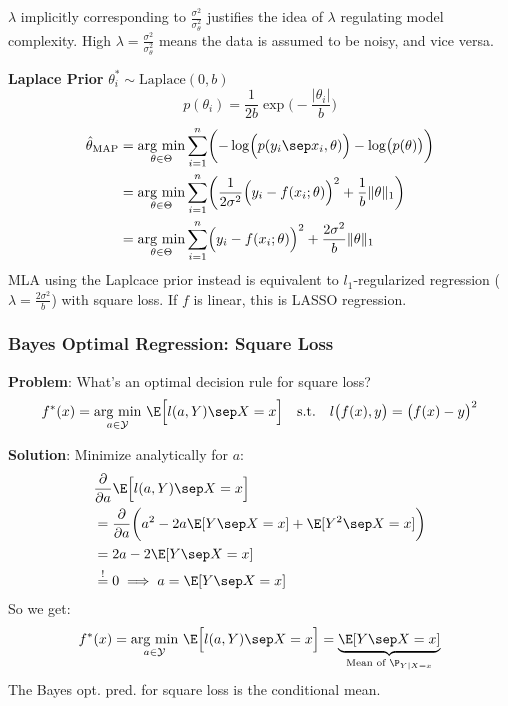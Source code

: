 {\footnotesize
    \remark $\lambda$ implicitly corresponding to $\frac{\sigma^2}{\sigma_\theta^2}$ justifies the idea of $\lambda$ regulating model complexity. High $\lambda = \frac{\sigma^2}{\sigma_\theta^2}$ means the data is assumed to be noisy, and vice versa.
}

 \textbf{Laplace Prior} $\theta_i^* \sim \text{Laplace}(0, b)$
$$
    p(\theta_i) = \frac{1}{2b}\exp\biggl(-\frac{|\theta_i|}{b}\biggr)
$$
{\footnotesize
\begin{align*}
    \hat{\theta}_\text{MAP} &= \underset{\theta\in\Theta}{\text{arg min}} \sum_{i=1}^{n} \biggl( -\log\Bigl( p(y_i \sep x_i, \theta) \Bigr) - \log\bigl(p(\theta)\bigr) \biggr) \\
                            &= \underset{\theta\in\Theta}{\text{arg min}} \sum_{i=1}^{n} \biggl( \frac{1}{2\sigma^2}\Bigl( y_i - f(x_i;\theta) \Bigr)^2 + \frac{1}{b}\Vert \theta \Vert_1 \biggr) \\
                            &= \underset{\theta\in\Theta}{\text{arg min}} \sum_{i=1}^{n} \Bigl( y_i - f(x_i;\theta) \Bigr)^2 + \frac{2\sigma^2}{b}\Vert\theta\Vert_1
\end{align*}
}
MLA using the Laplcace prior instead is equivalent to $l_1$-regularized regression ($\lambda = \frac{2\sigma^2}{b}$) with square loss. If $f$ is linear, this is LASSO regression.

\newpage

\subsubsection{Bayes Optimal Regression: Square Loss}

\textbf{Problem}: What's an optimal decision rule for square loss?
{\small
\begin{align*}
    f^*(x) = \underset{a\in\mathcal{Y}}{\text{arg min}}\ \E\Bigl[ l(a, Y) \sep X=x \Bigr] \quad \text{s.t.} \quad l\bigl( f(x), y \bigr) = \bigl( f(x)-y \bigr)^2
\end{align*}
}

\textbf{Solution}: Minimize analytically for $a$:
{\footnotesize
\begin{align*}
    & \frac{\partial}{\partial a} \E\Bigl[ l(a,Y)\sep X=x \Bigr] \\
    &= \frac{\partial}{\partial a} \biggl( a^2 - 2a\E[Y\sep X=x] + \E[Y^2\sep X=x] \biggr) \\
    &= 2a - 2\E[Y\sep X=x] \\
    &\overset{!}{=} 0 \implies a = \E[Y\sep X=x]
\end{align*}
}
So we get:
$$
    f^*(x) = \underset{a\in\mathcal{Y}}{\text{arg min}}\ \E\Bigl[ l(a,Y)\sep X=x \Bigr] = \underbrace{\E[Y\sep X=x]}_\text{Mean of $\P_{Y|X=x}$}
$$
The Bayes opt. pred. for square loss is the conditional mean.\\

